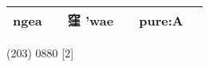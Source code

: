 \documentclass[14pt,a4paper]{scrartcl}
\begin{document}
\begin{longtable}[c]{@{}llllll@{}}
\begin{minipage}[t]{0.14\columnwidth}
ngea
\strut\end{minipage} &
\begin{minipage}[t]{0.14\columnwidth}\raggedright\strut
\strut\end{minipage} &
\begin{minipage}[t]{0.14\columnwidth}\raggedright\strut
窪 'wae
\strut\end{minipage} &
\begin{minipage}[t]{0.14\columnwidth}\raggedright\strut
\strut\end{minipage} &
\begin{minipage}[t]{0.14\columnwidth}\raggedright\strut
pure:A
\strut\end{minipage}\tabularnewline
\bottomrule
\end{longtable}

(203) 0880 {[}2{]}
\end{document}

